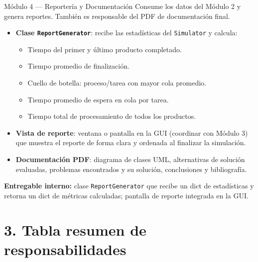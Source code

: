 \documentclass[12pt,letterpaper]{article}
\begin{document}
\begin{modbox}[mod4]{Módulo 4 --- Reportería y Documentación}
Consume los datos del Módulo 2 y genera reportes. También es responsable del PDF de documentación final.

\begin{itemize}[leftmargin=1.5em, itemsep=2pt]
    \item \textbf{Clase \texttt{ReportGenerator}}: recibe las estadísticas del \texttt{Simulator} y calcula:
    \begin{itemize}
        \item Tiempo del primer y último producto completado.
        \item Tiempo promedio de finalización.
        \item Cuello de botella: proceso/tarea con mayor cola promedio.
        \item Tiempo promedio de espera en cola por tarea.
        \item Tiempo total de procesamiento de todos los productos.
    \end{itemize}
    \item \textbf{Vista de reporte}: ventana o pantalla en la GUI (coordinar con Módulo 3) que muestra el reporte de forma clara y ordenada al finalizar la simulación.
    \item \textbf{Documentación PDF}: diagrama de clases UML, alternativas de solución evaluadas, problemas encontrados y su solución, conclusiones y bibliografía.
\end{itemize}

\textbf{Entregable interno:} clase \texttt{ReportGenerator} que recibe un dict de estadísticas y retorna un dict de métricas calculadas; pantalla de reporte integrada en la GUI.
\end{modbox}

\newpage
\section*{3. Tabla resumen de responsabilidades}
\end{document}
